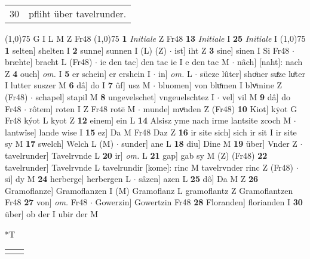 \documentclass[8pt,a4paper,notitlepage]{article}
\begin{document}
\begin{table}[ht]
\begin{minipage}[t]{0.5\linewidth}
\begin{tabular}{rl}
30 & pfliht über tavelrunder.\\ 
\end{tabular}
\scriptsize
\line(1,0){75} \newline
G I L M Z Fr48 \newline
\line(1,0){75} \newline
\textbf{1} \textit{Initiale} Z Fr48  \textbf{13} \textit{Initiale} I  \textbf{25} \textit{Initiale} I  \newline
\line(1,0){75} \newline
\textbf{1} selten] shelten I \textbf{2} sunne] sunnen I (L) (Z)  $\cdot$ ist] iht Z \textbf{3} sine] sinen I Si Fr48  $\cdot$ bræhte] bracht L (Fr48)  $\cdot$ ie den tac] den tac ie I e den tac M  $\cdot$ nâch] [naht]: nach Z \textbf{4} ouch] \textit{om.} I \textbf{5} er schein] er ershein I  $\cdot$ in] \textit{om.} L  $\cdot$ süeze lûter] shoͤner suͤze luͤter I lutter suszer M \textbf{6} dâ] do I \textbf{7} ûf] usz M  $\cdot$ bluomen] von bluͦmen I blvͤmine Z (Fr48)  $\cdot$ schapel] stapil M \textbf{8} ungevelschet] vngeuelschtez I  $\cdot$ vel] vil M \textbf{9} dâ] do Fr48  $\cdot$ rôtem] roten I Z Fr48 rotē M  $\cdot$ munde] mvͤnden Z (Fr48) \textbf{10} Kiot] kẏot G Fr48 kýot L kyot Z \textbf{12} einem] ein L \textbf{14} Alsisz yme nach irme lantsite zcoch M  $\cdot$ lantwîse] lande wise I \textbf{15} ez] Da M Fr48 Daz Z \textbf{16} ir site sich] sich ir sit I ir site sy M \textbf{17} swelch] Welch L (M)  $\cdot$ sunder] ane L \textbf{18} diu] Dine M \textbf{19} über] Vnder Z  $\cdot$ tavelrunder] Tavelrvnde L \textbf{20} ir] \textit{om.} L \textbf{21} gap] gab sy M (Z) (Fr48) \textbf{22} tavelrunder] Tavelrvnde L tavelrundir [kome]: rinc M tavelrvnder rinc Z (Fr48)  $\cdot$ si] dy M \textbf{24} herberge] herbergen L  $\cdot$ sâzen] azen L \textbf{25} dô] Da M Z \textbf{26} Gramoflanze] Gramoflanzen I (M) Gramoflanz L gramoflantz Z Gramoflantzen Fr48 \textbf{27} von] \textit{om.} Fr48  $\cdot$ Gowerzin] Gowertzin Fr48 \textbf{28} Floranden] florianden I \textbf{30} über] ob der I ubir der M \newline
\end{minipage}
\hspace{0.5cm}
\begin{minipage}[t]{0.5\linewidth}
\small
\begin{center}*T
\end{center}
\begin{tabular}{rl}
 & \textit{\begin{large}E\end{large}}z ist \textbf{worden selten} naht,\\ 

\end{tabular}
\end{minipage}
\end{table}
\end{document}
